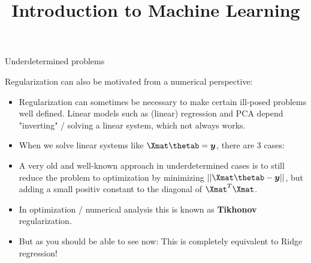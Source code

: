 



\newcommand{\titlefigure}{figure_man/undet-problem01.png}
\newcommand{\learninggoals}{
  \item \textcolor{blue}{XXX}
  \item \textcolor{blue}{XXX}
}

\title{Introduction to Machine Learning}
\date{}





\begin{vbframe} {Underdetermined problems}

Regularization can also be motivated from a numerical perspective: 

  \begin{itemize}
    \item Regularization can sometimes be necessary to make certain ill-posed problems well defined. Linear models such as (linear) regression and PCA depend "inverting" / solving a linear system, which not always works.
    \item When we solve linear systems like $\Xmat \thetab = \bm{y}$, there are 3 cases:  
  \begin{enumerate}
  \end{enumerate}
  \end{itemize}

\framebreak
  \begin{itemize}
   \item A very old and well-known approach in underdetermined cases is to still reduce the problem to optimization by minimizing $|| \Xmat \thetab - \bm{y}||$, but adding a small positiv constant to the diagonal of $\Xmat^T \Xmat$.
   \item In optimization / numerical analysis this is known as \textbf{Tikhonov} regularization. 
   \item But as you should be able to see now: This is completely equivalent to Ridge regression!
  \end{itemize}


\end{vbframe}
